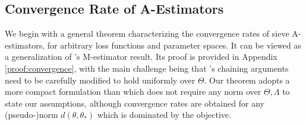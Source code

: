 \documentclass[12pt]{article}
\theoremstyle{myplain}
\theoremstyle{definition}
\theoremstyle{definition}
\theoremstyle{remark}
\numberwithin{equation}{section}
\begin{document}
\subsection{Convergence Rate of A-Estimators}
\label{subsec:generalrate}
We begin with a general theorem characterizing the convergence rates of sieve A-estimators, for arbitrary loss functions and parameter spaces. It can be viewed as a generalization of \cite{shen1994}'s M-estimator result. Its proof is provided in Appendix \ref{proof:convergence}, with the main challenge being that \cite{shen1994}'s chaining arguments need to be carefully modified to hold uniformly over $\Theta$. Our theorem adopts a more compact formulation than \cite{shen1994} which does not require any norm over $\Theta,\Lambda$ to state our assumptions, although convergence rates are obtained for any (pseudo-)norm $d(\theta,\theta_*)$ which is dominated by the objective.
\end{document}
